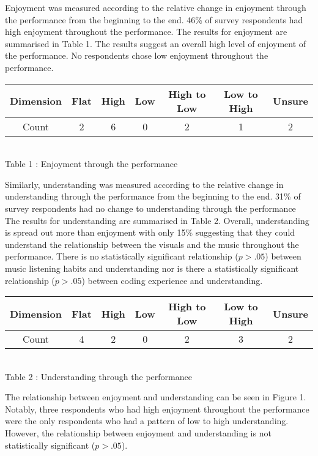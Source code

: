 Enjoyment was measured according to the relative change in enjoyment through the performance from the beginning to the end. 46\% of survey respondents had high enjoyment throughout the performance. The results for enjoyment are summarised in Table 1. The results suggest an overall high level of enjoyment of the performance. No respondents chose  low enjoyment throughout the performance.\\

\begin{center}
\begin{tabular}{|c|c|c|c|c|c|c|}
\hline 
Dimension & Flat & High & Low & High to Low & Low to High & Unsure\\
\hline 
Count & 2 &6 &0 &2 &1 &2\\
\hline
\end{tabular}\\
Table 1 : Enjoyment through the performance
\end{center}

Similarly, understanding was measured according to the relative change in understanding through the performance from the beginning to the end. 31\% of survey respondents had no change to understanding through the performance   The results for understanding are summarised in Table 2. Overall, understanding is spread out more than enjoyment with only 15\% suggesting that they could understand the relationship between the visuals and the music throughout the performance. There is no statistically significant relationship ($p > .05$) between music listening habits and understanding nor is there a statistically significant relationship ($p > .05$) between coding experience and understanding.\\

\begin{center}
\begin{tabular}{|c|c|c|c|c|c|c|}
\hline 
Dimension & Flat & High & Low & High to Low & Low to High & Unsure\\
\hline 
Count & 4 &
2&
0&
2&
3&
2 \\
\hline
\end{tabular}\\
Table 2 : Understanding through the performance
\end{center}

The relationship between enjoyment and understanding can be seen in Figure 1. Notably, three respondents who had high enjoyment throughout the performance were the only respondents who had a pattern of low to high understanding. However, the relationship between enjoyment and understanding is not statistically significant ($p > .05$).

